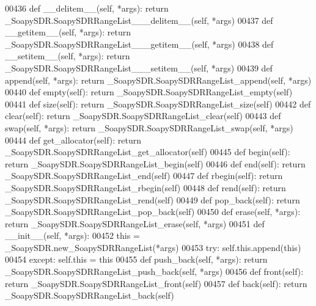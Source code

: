 \begin{DoxyCode}
{{{{00436     \textcolor{keyword}{def }__delitem__(self, *args): \textcolor{keywordflow}{return} \_SoapySDR.SoapySDRRangeList\_\_\_delitem\_\_(self, *args)
00437     \textcolor{keyword}{def }__getitem__(self, *args): \textcolor{keywordflow}{return} \_SoapySDR.SoapySDRRangeList\_\_\_getitem\_\_(self, *args)
00438     \textcolor{keyword}{def }__setitem__(self, *args): \textcolor{keywordflow}{return} \_SoapySDR.SoapySDRRangeList\_\_\_setitem\_\_(self, *args)
00439     \textcolor{keyword}{def }append(self, *args): \textcolor{keywordflow}{return} \_SoapySDR.SoapySDRRangeList\_append(self, *args)
00440     \textcolor{keyword}{def }empty(self): \textcolor{keywordflow}{return} \_SoapySDR.SoapySDRRangeList\_empty(self)
00441     \textcolor{keyword}{def }size(self): \textcolor{keywordflow}{return} \_SoapySDR.SoapySDRRangeList\_size(self)
00442     \textcolor{keyword}{def }clear(self): \textcolor{keywordflow}{return} \_SoapySDR.SoapySDRRangeList\_clear(self)
00443     \textcolor{keyword}{def }swap(self, *args): \textcolor{keywordflow}{return} \_SoapySDR.SoapySDRRangeList\_swap(self, *args)
00444     \textcolor{keyword}{def }get_allocator(self): \textcolor{keywordflow}{return} \_SoapySDR.SoapySDRRangeList\_get\_allocator(self)
00445     \textcolor{keyword}{def }begin(self): \textcolor{keywordflow}{return} \_SoapySDR.SoapySDRRangeList\_begin(self)
00446     \textcolor{keyword}{def }end(self): \textcolor{keywordflow}{return} \_SoapySDR.SoapySDRRangeList\_end(self)
00447     \textcolor{keyword}{def }rbegin(self): \textcolor{keywordflow}{return} \_SoapySDR.SoapySDRRangeList\_rbegin(self)
00448     \textcolor{keyword}{def }rend(self): \textcolor{keywordflow}{return} \_SoapySDR.SoapySDRRangeList\_rend(self)
00449     \textcolor{keyword}{def }pop_back(self): \textcolor{keywordflow}{return} \_SoapySDR.SoapySDRRangeList\_pop\_back(self)
00450     \textcolor{keyword}{def }erase(self, *args): \textcolor{keywordflow}{return} \_SoapySDR.SoapySDRRangeList\_erase(self, *args)
00451     \textcolor{keyword}{def }__init__(self, *args): 
00452         this = \_SoapySDR.new\_SoapySDRRangeList(*args)
00453         \textcolor{keywordflow}{try}: self.this.append(this)
00454         \textcolor{keywordflow}{except}: self.this = this
00455     \textcolor{keyword}{def }push_back(self, *args): \textcolor{keywordflow}{return} \_SoapySDR.SoapySDRRangeList\_push\_back(self, *args)
00456     \textcolor{keyword}{def }front(self): \textcolor{keywordflow}{return} \_SoapySDR.SoapySDRRangeList\_front(self)
00457     \textcolor{keyword}{def }back(self): \textcolor{keywordflow}{return} \_SoapySDR.SoapySDRRangeList\_back(self)
}}}}
\end{DoxyCode}
